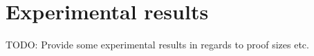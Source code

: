\section{Experimental results}

TODO: Provide some experimental results in regards to proof sizes etc.
